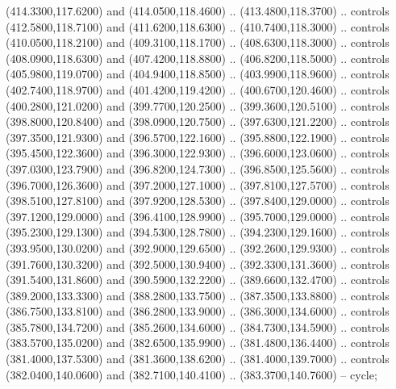 {\begin{scope}[y=0.80pt, x=0.80pt, yscale=-1, xscale=1, inner sep=0pt, outer sep=0pt, #1]
      (414.3300,117.6200) and (414.0500,118.4600) .. (413.4800,118.3700) .. controls
      (412.5800,118.7100) and (411.6200,118.6300) .. (410.7400,118.3000) .. controls
      (410.0500,118.2100) and (409.3100,118.1700) .. (408.6300,118.3000) .. controls
      (408.0900,118.6300) and (407.4200,118.8800) .. (406.8200,118.5000) .. controls
      (405.9800,119.0700) and (404.9400,118.8500) .. (403.9900,118.9600) .. controls
      (402.7400,118.9700) and (401.4200,119.4200) .. (400.6700,120.4600) .. controls
      (400.2800,121.0200) and (399.7700,120.2500) .. (399.3600,120.5100) .. controls
      (398.8000,120.8400) and (398.0900,120.7500) .. (397.6300,121.2200) .. controls
      (397.3500,121.9300) and (396.5700,122.1600) .. (395.8800,122.1900) .. controls
      (395.4500,122.3600) and (396.3000,122.9300) .. (396.6000,123.0600) .. controls
      (397.0300,123.7900) and (396.8200,124.7300) .. (396.8500,125.5600) .. controls
      (396.7000,126.3600) and (397.2000,127.1000) .. (397.8100,127.5700) .. controls
      (398.5100,127.8100) and (397.9200,128.5300) .. (397.8400,129.0000) .. controls
      (397.1200,129.0000) and (396.4100,128.9900) .. (395.7000,129.0000) .. controls
      (395.2300,129.1300) and (394.5300,128.7800) .. (394.2300,129.1600) .. controls
      (393.9500,130.0200) and (392.9000,129.6500) .. (392.2600,129.9300) .. controls
      (391.7600,130.3200) and (392.5000,130.9400) .. (392.3300,131.3600) .. controls
      (391.5400,131.8600) and (390.5900,132.2200) .. (389.6600,132.4700) .. controls
      (389.2000,133.3300) and (388.2800,133.7500) .. (387.3500,133.8800) .. controls
      (386.7500,133.8100) and (386.2800,133.9000) .. (386.3000,134.6000) .. controls
      (385.7800,134.7200) and (385.2600,134.6000) .. (384.7300,134.5900) .. controls
      (383.5700,135.0200) and (382.6500,135.9900) .. (381.4800,136.4400) .. controls
      (381.4000,137.5300) and (381.3600,138.6200) .. (381.4000,139.7000) .. controls
      (382.0400,140.0600) and (382.7100,140.4100) .. (383.3700,140.7600) -- cycle;


\end{scope}}
